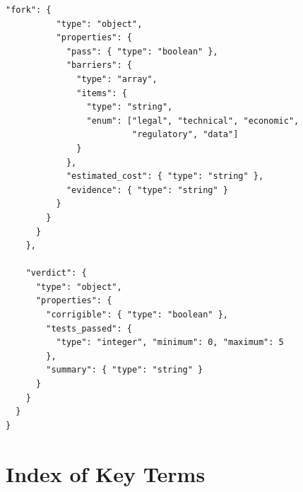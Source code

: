\documentclass[11pt,a4paper]{article}
\begin{document}
\begin{lstlisting}[style=json]
        "fork": {
          "type": "object",
          "properties": {
            "pass": { "type": "boolean" },
            "barriers": {
              "type": "array",
              "items": {
                "type": "string",
                "enum": ["legal", "technical", "economic",
                         "regulatory", "data"]
              }
            },
            "estimated_cost": { "type": "string" },
            "evidence": { "type": "string" }
          }
        }
      }
    },

    "verdict": {
      "type": "object",
      "properties": {
        "corrigible": { "type": "boolean" },
        "tests_passed": {
          "type": "integer", "minimum": 0, "maximum": 5
        },
        "summary": { "type": "string" }
      }
    }
  }
}
\end{lstlisting}

\section{Index of Key Terms}
\label{appendix:index}
\end{document}
